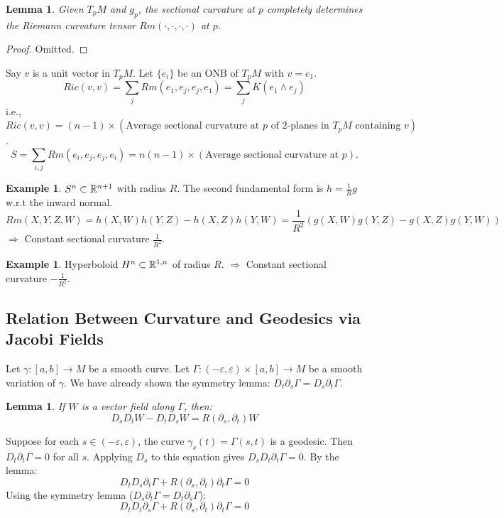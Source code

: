 \documentclass[11pt, a4paper]{article}
\theoremstyle{plain}
\newtheorem{lemma}[theorem]{Lemma}
\theoremstyle{definition}
\newtheorem{example}[theorem]{Example}
\theoremstyle{remark}
\begin{document}
{\begin{lemma}
Given $T_pM$ and $g_p$, the sectional curvature at $p$ completely determines the Riemann curvature tensor $Rm(\cdot, \cdot, \cdot, \cdot)$ at $p$.
\end{lemma}
\begin{proof}
    Omitted.
\end{proof}

Say $v$ is a unit vector in $T_pM$. Let $\{e_i\}$ be an ONB of $T_pM$ with $v = e_1$.
\[ Ric(v,v) = \sum_j Rm(e_1, e_j, e_j, e_1) = \sum_j K(e_1 \wedge e_j) \]
i.e., $Ric(v,v) = (n-1) \times (\text{Average sectional curvature at } p \text{ of 2-planes in } T_pM \text{ containing } v)$.
\[ S = \sum_{i,j} Rm(e_i, e_j, e_j, e_i) = n(n-1) \times (\text{Average sectional curvature at } p). \]

\begin{example}
$S^n \subset \mathbb{R}^{n+1}$ with radius $R$.
The second fundamental form is $h = \frac{1}{R} g$ w.r.t the inward normal.
\[ Rm(X,Y,Z,W) = h(X,W)h(Y,Z) - h(X,Z)h(Y,W) = \frac{1}{R^2} (g(X,W)g(Y,Z) - g(X,Z)g(Y,W)) \]
$\Rightarrow$ Constant sectional curvature $\frac{1}{R^2}$.
\end{example}
\begin{example}
Hyperboloid $H^n \subset \mathbb{R}^{1,n}$ of radius $R$.
$\Rightarrow$ Constant sectional curvature $-\frac{1}{R^2}$.
\end{example}

\subsection{Relation Between Curvature and Geodesics via Jacobi Fields}

Let $\gamma: [a,b] \to M$ be a smooth curve. Let $\Gamma: (-\varepsilon, \varepsilon) \times [a,b] \to M$ be a smooth variation of $\gamma$.
We have already shown the symmetry lemma: $D_t \partial_s \Gamma = D_s \partial_t \Gamma$.

\begin{lemma}
If $W$ is a vector field along $\Gamma$, then:
\[ D_s D_t W - D_t D_s W = R(\partial_s, \partial_t)W \]
\end{lemma}

Suppose for each $s \in (-\varepsilon, \varepsilon)$, the curve $\gamma_s(t) = \Gamma(s,t)$ is a geodesic. Then $D_t \partial_t \Gamma = 0$ for all $s$.
Applying $D_s$ to this equation gives $D_s D_t \partial_t \Gamma = 0$. By the lemma:
\[ D_t D_s \partial_t \Gamma + R(\partial_s, \partial_t)\partial_t \Gamma = 0 \]
Using the symmetry lemma ($D_s \partial_t \Gamma = D_t \partial_s \Gamma$):
\[ D_t D_t \partial_s \Gamma + R(\partial_s, \partial_t)\partial_t \Gamma = 0 \]

}
\end{document}
